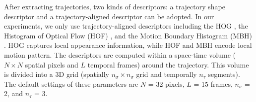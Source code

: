 \documentclass[final,3p,times,twocolumn]{elsarticle}
\begin{document}
After extracting trajectories, two kinds of descriptors: a trajectory shape descriptor and a trajectory-aligned descriptor can be adopted. In our experiments, we only use trajectory-aligned descriptors including the HOG \cite{dalal2005histograms}, the Histogram of Optical Flow (HOF) \cite{laptev2008learning}, and the Motion Boundary Histogram (MBH) \cite{dalal2006human}. HOG captures local appearance information, while HOF and MBH encode local motion pattern. The descriptors are computed within a space-time volume ($N \times N$ spatial pixels and $L$ temporal frames) around the trajectory. This volume is divided into a 3D grid (spatially $n_\sigma \times n_\sigma$ grid and temporally $n_\tau$ segments). The default settings of these parameters are $N$ = 32 pixels, $L$ = 15 frames, $n_\sigma$ = 2, and $n_\tau$ = 3.

\end{document}
